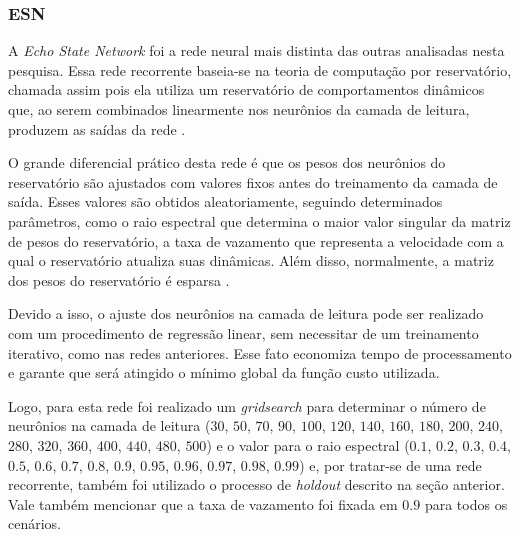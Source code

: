 \documentclass[9pt, technote]{article}
\begin{document}
\subsubsection{ESN}

A \textit{Echo State Network} foi a rede neural mais distinta das outras analisadas nesta pesquisa. Essa rede recorrente baseia-se na teoria de computação por reservatório, chamada assim pois ela utiliza um reservatório de comportamentos dinâmicos que, ao serem combinados linearmente nos neurônios da camada de leitura, produzem as saídas da rede \cite{boccato2013novas}. 

O grande diferencial prático desta rede é que os pesos dos neurônios do reservatório são ajustados com valores fixos antes do treinamento da camada de saída. Esses valores são obtidos aleatoriamente, seguindo determinados parâmetros, como o raio espectral que determina o maior valor singular da matriz de pesos do reservatório,  a taxa de vazamento que representa a velocidade com a qual o reservatório atualiza suas dinâmicas. Além disso, normalmente, a matriz dos pesos do reservatório é esparsa \cite{jaeger2007echo}.

Devido a isso, o ajuste dos neurônios na camada de leitura pode ser realizado com um procedimento de regressão linear, sem necessitar de um treinamento iterativo, como nas redes anteriores. Esse fato economiza tempo de processamento e garante que será atingido o mínimo global da função custo utilizada.

Logo, para esta rede foi realizado um \textit{gridsearch} para determinar o número de neurônios na camada de leitura ($30$, $50$, $70$, $90$, $100$, $120$, $140$, $160$, $180$, $200$, $240$, $280$, $320$, $360$, $400$, $440$, $480$, $500$) e o valor para o raio espectral ($0.1$, $0.2$, $0.3$, $0.4$, $0.5$, $0.6$, $0.7$, $0.8$, $0.9$, $0.95$, $0.96$, $0.97$, $0.98$, $0.99$) e, por tratar-se de uma rede recorrente, também foi utilizado o processo de \textit{holdout} descrito na seção anterior. Vale também mencionar que a taxa de vazamento foi fixada em $0.9$ para todos os cenários.
\end{document}
